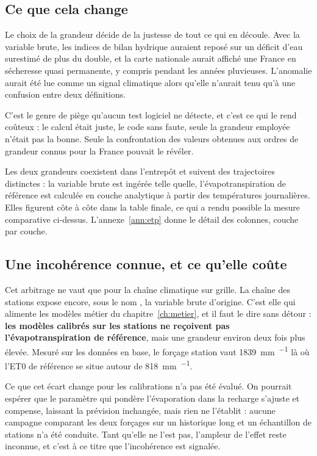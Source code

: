 \subsection{Ce que cela change}

Le choix de la grandeur décide de la justesse de tout ce qui en découle. Avec la variable brute,
les indices de bilan hydrique auraient reposé sur un déficit d'eau surestimé de plus du double,
et la carte nationale aurait affiché une France en sécheresse quasi permanente, y compris
pendant les années pluvieuses. L'anomalie aurait été lue comme un signal climatique alors
qu'elle n'aurait tenu qu'à une confusion entre deux définitions.

C'est le genre de piège qu'aucun test logiciel ne détecte, et c'est ce qui le rend coûteux : le
calcul était juste, le code sans faute, seule la grandeur employée n'était pas la bonne. Seule
la confrontation des valeurs obtenues aux ordres de grandeur connus pour la France pouvait le
révéler.

Les deux grandeurs coexistent dans l'entrepôt et suivent des trajectoires distinctes : la
variable brute est ingérée telle quelle, l'évapotranspiration de référence est calculée en
couche analytique à partir des températures journalières. Elles figurent côte à côte dans la
table finale, ce qui a rendu possible la mesure comparative ci-dessus.
L'annexe~\ref{ann:etp} donne le détail des colonnes, couche par couche.

\subsection{Une incohérence connue, et ce qu'elle coûte}

Cet arbitrage ne vaut que pour la chaîne climatique sur grille. La chaîne des stations expose
encore, sous le nom , la variable brute d'origine. C'est elle qui
alimente les modèles métier du chapitre~\ref{ch:metier}, et il faut le dire sans détour :
\textbf{les modèles calibrés sur les stations ne reçoivent pas l'évapotranspiration de
référence}, mais une grandeur environ deux fois plus élevée. Mesuré sur les données en base, le
forçage station vaut \SI{1839}{\milli\metre\per\an} là où l'ET0 de référence se situe autour de
\SI{818}{\milli\metre\per\an}.

Ce que cet écart change pour les calibrations n'a pas été évalué. On pourrait espérer que
le paramètre qui pondère l'évaporation dans la recharge s'ajuste et compense, laissant la
prévision inchangée, mais rien ne l'établit : aucune campagne comparant les deux forçages sur
un historique long et un échantillon de stations n'a été conduite. Tant qu'elle ne l'est pas,
l'ampleur de l'effet reste inconnue, et c'est à ce titre que l'incohérence est signalée.


